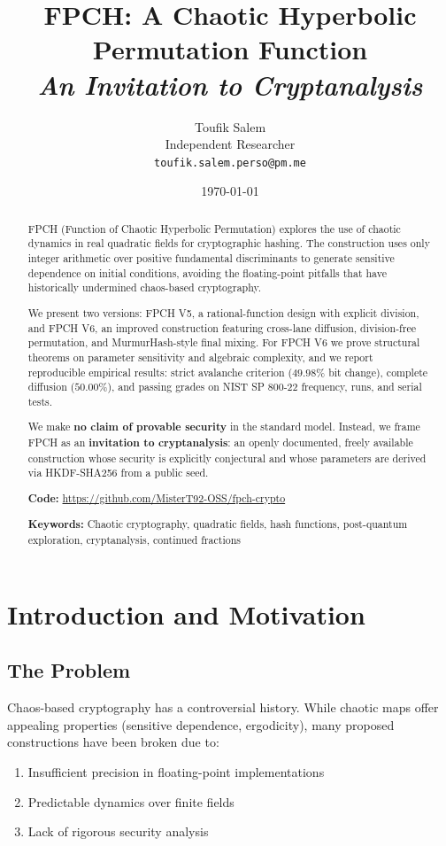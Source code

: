 \documentclass[11pt,a4paper]{article}
\title{\textbf{FPCH: A Chaotic Hyperbolic Permutation Function}\\\textit{An Invitation to Cryptanalysis}}
\author{Toufik Salem\\\small Independent Researcher\\\small \texttt{toufik.salem.perso@pm.me}}
\date{\today}
\theoremstyle{plain}
\theoremstyle{definition}
\theoremstyle{remark}
\begin{document}
\maketitle

\begin{abstract}
FPCH (Function of Chaotic Hyperbolic Permutation) explores the use of chaotic dynamics in real quadratic fields for cryptographic hashing. The construction uses only integer arithmetic over positive fundamental discriminants to generate sensitive dependence on initial conditions, avoiding the floating-point pitfalls that have historically undermined chaos-based cryptography.

We present two versions: FPCH V5, a rational-function design with explicit division, and FPCH V6, an improved construction featuring cross-lane diffusion, division-free permutation, and MurmurHash-style final mixing. For FPCH V6 we prove structural theorems on parameter sensitivity and algebraic complexity, and we report reproducible empirical results: strict avalanche criterion ($49.98\%$ bit change), complete diffusion ($50.00\%$), and passing grades on NIST SP 800-22 frequency, runs, and serial tests.

We make \textbf{no claim of provable security} in the standard model. Instead, we frame FPCH as an \textbf{invitation to cryptanalysis}: an openly documented, freely available construction whose security is explicitly conjectural and whose parameters are derived via HKDF-SHA256 from a public seed.

\textbf{Code:} \url{https://github.com/MisterT92-OSS/fpch-crypto}

\textbf{Keywords:} Chaotic cryptography, quadratic fields, hash functions, post-quantum exploration, cryptanalysis, continued fractions
\end{abstract}

\section{Introduction and Motivation}

\subsection{The Problem}

Chaos-based cryptography has a controversial history. While chaotic maps offer appealing properties (sensitive dependence, ergodicity), many proposed constructions have been broken due to:
\begin{enumerate}
    \item Insufficient precision in floating-point implementations \cite{alvarez2006}
    \item Predictable dynamics over finite fields \cite{li2003}
    \item Lack of rigorous security analysis \cite{alvarez2006}
\end{enumerate}
\end{document}
